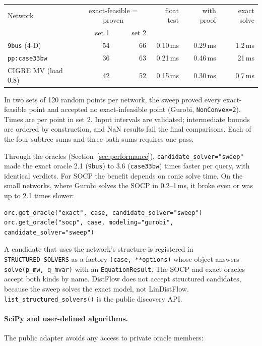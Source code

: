 \documentclass[11pt,a4paper]{report}
\newcommand{\code}[1]{\texttt{\small #1}}
\begin{document}
\begin{center}\small
\begin{tabular}{@{}lrrrrr@{}}
\toprule
Network & \multicolumn{2}{c}{exact-feasible = proven} & float test & with proof & exact solve \\
        & set 1 & set 2 & & & \\
\midrule
\code{9bus} (4-D)        & 54 & 66 & 0.10\,ms & 0.29\,ms & 1.2\,ms \\
\code{pp:case33bw}       & 36 & 63 & 0.21\,ms & 0.46\,ms & 21\,ms  \\
CIGRE MV (load 0.8)      & 42 & 52 & 0.15\,ms & 0.30\,ms & 0.7\,ms \\
\bottomrule
\end{tabular}
\end{center}

\noindent In two sets of 120 random points per network, the sweep proved every
exact-feasible point and accepted no exact-infeasible point
(Gurobi, \code{NonConvex=2}). Times are per point in set 2. Input intervals
are validated; intermediate bounds are ordered by construction, and NaN
results fail the final comparisons. Each of the four subtree sums and three
path sums requires one pass.

Through the oracles (Section~\ref{sec:performance}),
\code{candidate\_solver="sweep"} made the exact oracle 2.1 (\code{9bus}) to
3.6 (\code{case33bw}) times faster per query, with identical verdicts. For SOCP
the benefit depends on conic solve time. On the small networks, where Gurobi solves the SOCP
in 0.2--1\,ms, it broke even or was up to 2.1 times slower:
\begin{lstlisting}
orc.get_oracle("exact", case, candidate_solver="sweep")
orc.get_oracle("socp", case, modeling="gurobi", candidate_solver="sweep")
\end{lstlisting}
A candidate that uses the network's structure is registered in
\code{STRUCTURED\_SOLVERS} as a factory \code{(case, **options)} whose object
answers \code{solve(p\_mw, q\_mvar)} with an \code{EquationResult}. The SOCP and
exact oracles accept both kinds by name. DistFlow does not accept structured
candidates, because the sweep solves the exact model, not LinDistFlow.
\code{list\_structured\_solvers()} is the public discovery API.

\paragraph{SciPy and user-defined algorithms.} The public adapter avoids any
access to private oracle members:
\end{document}
